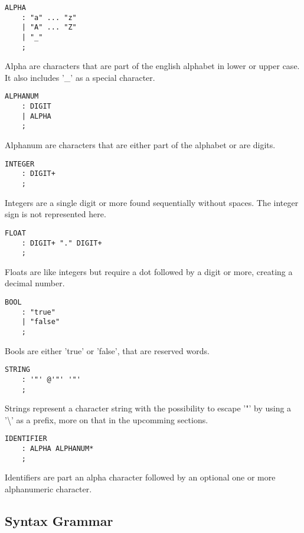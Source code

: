 \begin{lstlisting}
ALPHA
    : "a" ... "z"
    | "A" ... "Z"
    | "_"
    ;
\end{lstlisting}

Alpha are characters that are part of the english alphabet in lower or upper case. It also includes '\_' as a special character.

\begin{lstlisting}
ALPHANUM
    : DIGIT
    | ALPHA
    ;
\end{lstlisting}

Alphanum are characters that are either part of the alphabet or are digits.

\begin{lstlisting}
INTEGER
    : DIGIT+
    ;
\end{lstlisting}

Integers are a single digit or more found sequentially without spaces. The integer sign is not represented here.

\begin{lstlisting}
FLOAT
    : DIGIT+ "." DIGIT+
    ;
\end{lstlisting}

Floats are like integers but require a dot followed by a digit or more, creating a decimal number.

\begin{lstlisting}
BOOL
    : "true"
    | "false"
    ;
\end{lstlisting}

Bools are either 'true' or 'false', that are reserved words.

\begin{lstlisting}
STRING
    : '"' @'"' '"'
    ;
\end{lstlisting}

Strings represent a character string with the possibility to escape '"' by using a '\textbackslash' as a prefix, more on that in the upcomming sections.

\begin{lstlisting}
IDENTIFIER
    : ALPHA ALPHANUM*
    ;
\end{lstlisting}

Identifiers are part an alpha character followed by an optional one or more alphanumeric character.

\subsection{Syntax Grammar}


